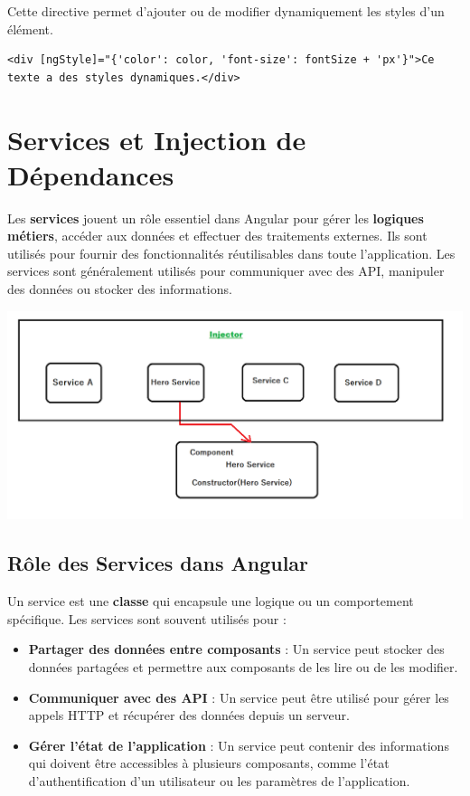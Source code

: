 \documentclass{article}
\begin{document}
Cette directive permet d’ajouter ou de modifier dynamiquement les styles d’un élément.
\begin{verbatim}
<div [ngStyle]="{'color': color, 'font-size': fontSize + 'px'}">Ce texte a des styles dynamiques.</div>
\end{verbatim}

\section{Services et Injection de Dépendances}

Les \textbf{services} jouent un rôle essentiel dans Angular pour gérer les \textbf{logiques métiers}, accéder aux données et effectuer des traitements externes. Ils sont utilisés pour fournir des fonctionnalités réutilisables dans toute l’application. Les services sont généralement utilisés pour communiquer avec des API, manipuler des données ou stocker des informations.
\begin{tcolorbox}[colframe=black!70, colback=white, title=Figure 7: Services et Injection de D´ependances, fonttitle=\bfseries]
\centering
\includegraphics[width=\textwidth]{images/0_R0nqYsF51ACGiI_K.png}
\end{tcolorbox}

\subsection{Rôle des Services dans Angular}

Un service est une \textbf{classe} qui encapsule une logique ou un comportement spécifique. Les services sont souvent utilisés pour :
\begin{itemize}
  \item \textbf{Partager des données entre composants} : Un service peut stocker des données partagées et permettre aux composants de les lire ou de les modifier.
  \item \textbf{Communiquer avec des API} : Un service peut être utilisé pour gérer les appels HTTP et récupérer des données depuis un serveur.
  \item \textbf{Gérer l’état de l’application} : Un service peut contenir des informations qui doivent être accessibles à plusieurs composants, comme l'état d'authentification d'un utilisateur ou les paramètres de l'application.
\end{itemize}
\end{document}
